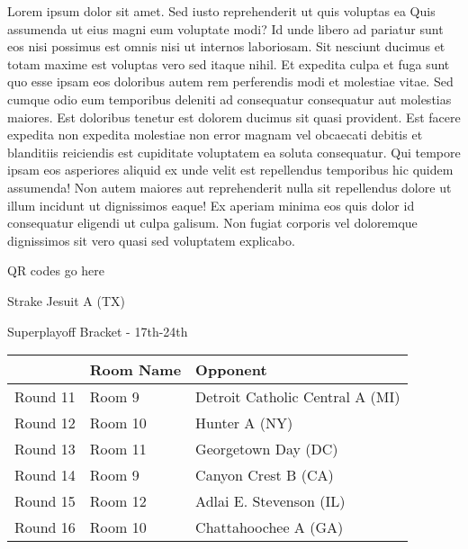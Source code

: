 \documentclass{article}%
\begin{document}
\vspace*{8pt}%
\linebreak%
\newline%
\newline%
    Lorem ipsum dolor sit amet. Sed iusto reprehenderit ut quis voluptas ea Quis assumenda ut eius magni eum voluptate modi? Id unde libero ad pariatur sunt eos nisi possimus est omnis nisi ut internos laboriosam. Sit nesciunt ducimus et totam maxime est voluptas vero sed itaque nihil. Et expedita culpa et fuga sunt quo esse ipsam eos doloribus autem rem perferendis modi et molestiae vitae.\newline%
\newline%
    Sed cumque odio eum temporibus deleniti ad consequatur consequatur aut molestias maiores. Est doloribus tenetur est dolorem ducimus sit quasi provident. Est facere expedita non expedita molestiae non error magnam vel obcaecati debitis et blanditiis reiciendis est cupiditate voluptatem ea soluta consequatur. Qui tempore ipsam eos asperiores aliquid ex unde velit est repellendus temporibus hic quidem assumenda!\newline%
\newline%
    Non autem maiores aut reprehenderit nulla sit repellendus dolore ut illum incidunt ut dignissimos eaque! Ex aperiam minima eos quis dolor id consequatur eligendi ut culpa galisum. Non fugiat corporis vel doloremque dignissimos sit vero quasi sed voluptatem explicabo.\newline%
\newline%
\vspace*{30pt}%
\begin{center}%
\begin{Huge}%
QR codes go here%
\end{Huge}%
\end{center}%
\newpage%
\begin{center}%
\begin{Huge}%
Strake Jesuit A (TX)%
\end{Huge}%
\vspace*{8pt}%
\linebreak%
\begin{Large}%
Superplayoff Bracket {-} 17th{-}24th%
\end{Large}%
\end{center}%
%
\begin{tabularx}{\textwidth}{|c|Y|Y|}%
\hline%
&Room Name&Opponent\\%
\hline%
Round 11&Room 9&Detroit Catholic Central A (MI)\\%
Round 12&Room 10&Hunter A (NY)\\%
Round 13&Room 11&Georgetown Day (DC)\\%
Round 14&Room 9&Canyon Crest B (CA)\\%
Round 15&Room 12&Adlai E. Stevenson (IL)\\%
Round 16&Room 10&Chattahoochee A (GA)\\%
\hline%
\end{tabularx}%
\end{document}
